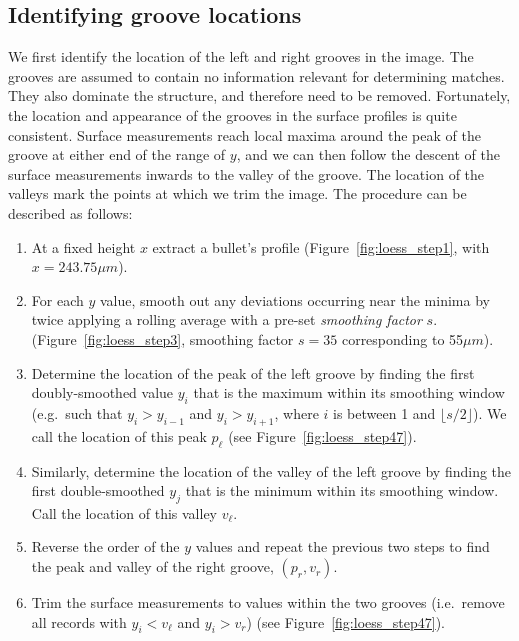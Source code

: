 \documentclass[aoas, preprint]{imsart}\usepackage[]{graphicx}\usepackage[]{color}
\begin{document}
\subsection{Identifying groove locations}
We first identify the location of the left and right grooves in the image. The grooves are assumed to contain no information relevant for determining matches. They also dominate the structure, and therefore need to be removed.  
Fortunately, the location and appearance of the grooves in the surface profiles is quite consistent.
Surface measurements reach local maxima around the peak of the groove at either end of the range of $y$, and we can then follow the descent of the surface measurements inwards to the valley of the groove. 
The location of the valleys mark the points at which we trim the image. The procedure can be described as follows:

\begin{enumerate}
    \item At a fixed height $x$ extract a bullet's profile (Figure~\ref{fig:loess_step1}, with $x = 243.75\mu m$).
    \item For each $y$ value, smooth out any deviations occurring near the minima by twice applying a rolling average with a pre-set \emph{smoothing factor} $s$. (Figure~\ref{fig:loess_step3}, smoothing factor $s = 35$ corresponding to 55$\mu m$).
    \item Determine the location of the peak of the left groove by finding the first doubly-smoothed value $y_i$ that is the maximum within its smoothing window (e.g.\ such that $y_i > y_{i - 1}$ and $y_i > y_{i + 1}$, where $i$ is between 1  and $\lfloor s/2 \rfloor$). We call the location of this peak $p_{\ell}$ (see Figure~\ref{fig:loess_step47}). 
    \item Similarly, determine the location of the valley of the left groove by finding the first double-smoothed $y_j$ that is the minimum within its smoothing window. Call the location of this valley $v_{\ell}$.
    \item Reverse the order of the $y$ values and repeat the previous two steps to find the peak and valley of the right groove, $(p_{r}, v_{r})$.
    \item Trim the surface measurements to values within the two grooves (i.e.\ remove all records with $y_i < v_{\ell}$ and $y_i > v_{r}$) (see Figure~\ref{fig:loess_step47}).
\end{enumerate}
\end{document}
